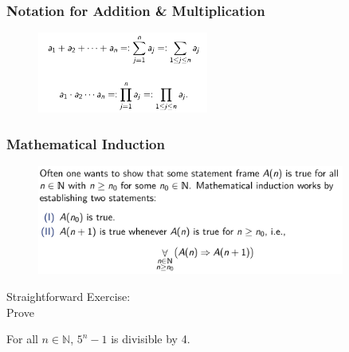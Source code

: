 \documentclass[10pt, t]{beamer}
\newcommand{\N}{\mathbb{N}}
\newcommand{\nullspace}{~\\[15pt]}
\begin{document}
\begin{frame}
    \frametitle{Notation for Addition \& Multiplication}
    \begin{figure}[H]
        \centering
        \includegraphics[width=0.5\textwidth]{2020-09-23-13-08-15.png}
    \end{figure}
\end{frame}

\begin{frame}
    \frametitle{Mathematical Induction}

    \begin{figure}[H]
        \centering
        \includegraphics[width=0.9\textwidth]{2020-09-23-12-37-23.png}
    \end{figure}
    Straightforward Exercise:\nullspace Prove
    \begin{center}
        For all $n\in \N$, $5^n - 1$ is divisible by 4.
    \end{center}
\end{frame}
\end{document}
